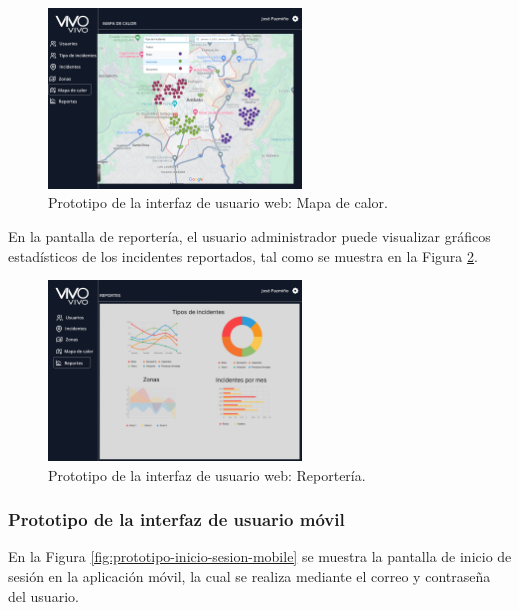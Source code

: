 \begin{figure}[H]
    \centering
    \includegraphics[width=0.6\textwidth]{chapters/III-resultados-y-discusion/resources/images/prototipo-mapa-de-calor-web.png}
    \caption{Prototipo de la interfaz de usuario web: Mapa de calor.}
    \label{fig:prototipo-mapa-de-calor-web}
\end{figure}

En la pantalla de reportería, el usuario administrador puede visualizar gráficos estadísticos de los incidentes reportados, tal como se muestra
en la Figura \ref{fig:prototipo-reporteria-web}.

\begin{figure}[H]
    \centering
    \includegraphics[width=0.6\textwidth]{chapters/III-resultados-y-discusion/resources/images/prototipo-reporteria-web.png}
    \caption{Prototipo de la interfaz de usuario web: Reportería.}
    \label{fig:prototipo-reporteria-web}
\end{figure}

\subsubsection{Prototipo de la interfaz de usuario móvil}
En la Figura \ref{fig:prototipo-inicio-sesion-mobile} se muestra la pantalla de inicio de sesión en la aplicación móvil, la cual se realiza mediante
el correo y contraseña del usuario.

